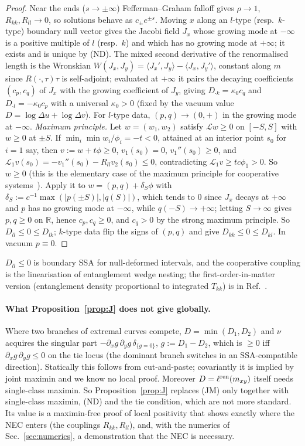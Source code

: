 \documentclass[aps,prd,onecolumn,superscriptaddress,nofootinbib,amsmath,amssymb,11pt]{revtex4-2}
\theoremstyle{definition}
\newcommand{\R}{\mathbb{R}}
\begin{document}
\begin{proof}
Near the ends ($s\to\pm\infty$) Fefferman--Graham falloff gives $\rho\to1$, $R_{kk},R_{ll}\to0$, so solutions behave as $c_\pm e^{\pm s}$. Moving
$x$ along an $l$-type (resp.\ $k$-type) boundary null vector gives the Jacobi field $J_x$ whose growing mode at $-\infty$ is a positive
multiple of $l$ (resp.\ $k$) and which has no growing mode at $+\infty$; it exists and is unique by (ND). The mixed second derivative of
the renormalised length is the Wronskian $W(J_x,J_y)=\langle J_x',J_y\rangle-\langle J_x,J_y'\rangle$, constant along $m$ since $R(\cdot,\tau)\tau$ is
self-adjoint; evaluated at $+\infty$ it pairs the decaying coefficients $(c_p,c_q)$ of $J_x$ with the growing coefficient of $J_y$, giving
$D_{\cdot k}=\kappa_0c_q$ and $D_{\cdot l}=-\kappa_0c_p$ with a universal $\kappa_0>0$ (fixed by the vacuum value $D=\log\Delta u+\log\Delta v$). For
$l$-type data, $(p,q)\to(0,+)$ in the growing mode at $-\infty$.
\emph{Maximum principle.} Let $w=(w_1,w_2)$ satisfy $\mathcal Lw\ge0$ on $[-S,S]$ with $w\ge0$ at $\pm S$. If $\min_i\min w_i/\phi_i=-t<0$, attained
at an interior point $s_0$ for $i=1$ say, then $v:=w+t\phi\ge0$, $v_1(s_0)=0$, $v_1''(s_0)\ge0$, and
$\mathcal L_1v(s_0)=-v_1''(s_0)-R_{ll}v_2(s_0)\le0$, contradicting $\mathcal L_1v\ge tc\phi_1>0$. So $w\ge0$ (this is the elementary case of the
maximum principle for cooperative systems~\cite{Sweers1992}). Apply it to $w=(p,q)+\delta_S\phi$ with $\delta_S:=c^{-1}\max(|p(\pm S)|,|q(S)|)$,
which tends to $0$ since $J_x$ decays at $+\infty$ and $p$ has no growing mode at $-\infty$, while $q(-S)\to+\infty$; letting $S\to\infty$
gives $p,q\ge0$ on $\R$, hence $c_p,c_q\ge0$, and $c_q>0$ by the strong maximum principle. So $D_{ll}\le0\le D_{lk}$; $k$-type data flip the
signs of $(p,q)$ and give $D_{kk}\le0\le D_{kl}$. In vacuum $p\equiv0$.
\end{proof}

$D_{ll}\le0$ is boundary SSA for null-deformed intervals, and the cooperative coupling is the linearisation of entanglement wedge nesting;
the first-order-in-matter version (entanglement density proportional to integrated $T_{kk}$) is in Ref.~\cite{BHRT2015}.

\paragraph*{What Proposition~\ref{prop:J} does not give globally.} Where two branches of extremal curves compete, $D=\min(D_1,D_2)$ and $\nu$
acquires the singular part $-\partial_xg\,\partial_yg\,\delta_{\{g=0\}}$, $g:=D_1-D_2$, which is $\ge0$ iff $\partial_xg\,\partial_yg\le0$ on the tie
locus (the dominant branch switches in an SSA-compatible direction). Statically this follows from cut-and-paste; covariantly it is implied
by joint maximin and we know no local proof. Moreover $D=\ell^{\rm ren}(m_{xy})$ itself needs single-class maximin. So
Proposition~\ref{prop:J} replaces (JM) only together with single-class maximin, (ND) and the tie condition, which are not more standard.
Its value is a maximin-free proof of local positivity that shows exactly where the NEC enters (the couplings $R_{kk},R_{ll}$), and,
with the numerics of Sec.~\ref{sec:numerics}, a demonstration that the NEC is necessary.
\end{document}
